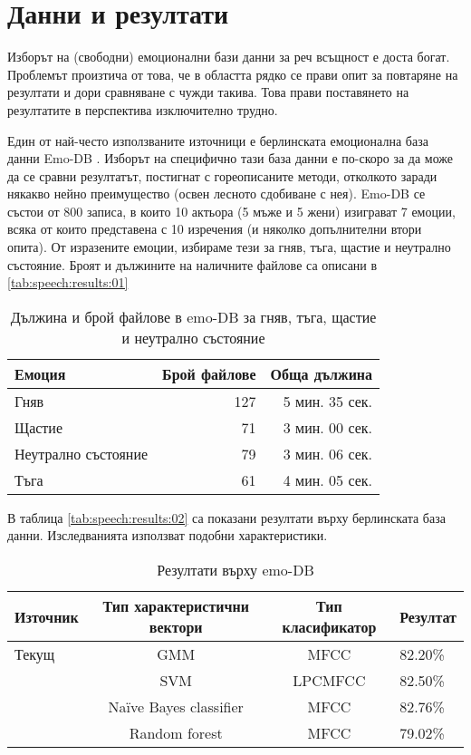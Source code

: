 \documentclass[main.tex]{subfiles}
\begin{document}
\section{Данни и резултати}
Изборът на (свободни) емоционални бази данни за реч всъщност е доста богат. Проблемът произтича от това, че в областта рядко се прави опит за повтаряне на резултати и дори сравняване с чужди такива. Това прави поставянето на резултатите в перспектива изключително трудно. 

Един от най-често използваните източници е берлинската емоционална база данни Emo-DB \cite{berlin}. Изборът на специфично тази база данни е по-скоро за да може да се сравни резултатът, постигнат с гореописаните методи, отколкото заради някакво нейно преимущество (освен лесното сдобиване с нея). Emo-DB се състои от 800 записа, в които 10 актьора (5 мъже и 5 жени) изиграват 7 емоции, всяка от които представена с 10 изречения (и няколко допълнителни втори опита). От изразените емоции, избираме тези за гняв, тъга, щастие и неутрално състояние. Броят и дължините на наличните файлове са описани в \autoref{tab:speech:results:01}

\begin{table}[h]
    \begin{center}
    \begin{tabular}{|l|r|r|} 
        \hline
        Емоция & Брой файлове & Обща дължина\\ 
        \hline
        Гняв & 127 & 5 мин. 35 сек.\\ 
        Щастие &  71 & 3 мин. 00 сек.\\ 
        Неутрално състояние &  79 & 3 мин. 06 сек.\\ 
        Тъга &  61 & 4 мин. 05 сек.\\ 
        \hline
    \end{tabular}
    \caption{Дължина и брой файлове в emo-DB за гняв, тъга, щастие и неутрално състояние}
    \label{tab:speech:results:01}
    \end{center}
\end{table}

В таблица \autoref{tab:speech:results:02} са показани резултати върху берлинската база данни. Изследванията използват подобни характеристики.
\begin{table}[h]
\begin{center}
    \begin{tabular}{ |l|c|c|l| } 
     \hline
     Източник & Тип характеристични вектори & Тип класификатор & Резултат \\ 
     \hline
     Текущ & GMM & MFCC & 82.20\% \\ 
     \cite{first} & SVM & LPCMFCC & 82.50\% \\ 
     \cite{second} &  Naïve Bayes classifier & MFCC & 82.76\% \\ 
     \cite{third} &  Random forest & MFCC & 79.02\% \\ 
     \hline
    \end{tabular}
    \caption{Резултати върху emo-DB}
    \label{tab:speech:results:02}
    \end{center}
\end{table}
\end{document}
